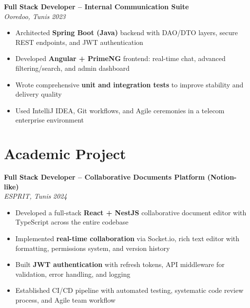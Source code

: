 \documentclass[10pt,a4paper]{article}
\begin{document}
{\vspace{4pt}
\textbf{Full Stack Developer -- Internal Communication Suite} \\[1pt]
\textit{Ooredoo, Tunis} \hfill \textit{2023}
\begin{itemize}
  \item Architected \textbf{Spring Boot (Java)} backend with DAO/DTO layers, secure REST endpoints, and JWT authentication
  \item Developed \textbf{Angular + PrimeNG} frontend: real-time chat, advanced filtering/search, and admin dashboard
  \item Wrote comprehensive \textbf{unit and integration tests} to improve stability and delivery quality
  \item Used IntelliJ IDEA, Git workflows, and Agile ceremonies in a telecom enterprise environment
\end{itemize}

}

\section*{Academic Project}
{\small
\textbf{Full Stack Developer -- Collaborative Documents Platform (Notion-like)} \\[1pt]
\textit{ESPRIT, Tunis} \hfill \textit{2024}
\begin{itemize}
  \item Developed a full-stack \textbf{React + NestJS} collaborative document editor with TypeScript across the entire codebase
  \item Implemented \textbf{real-time collaboration} via Socket.io, rich text editor with formatting, permissions system, and version history
  \item Built \textbf{JWT authentication} with refresh tokens, API middleware for validation, error handling, and logging
  \item Established CI/CD pipeline with automated testing, systematic code review process, and Agile team workflow
\end{itemize}
}

\end{document}

